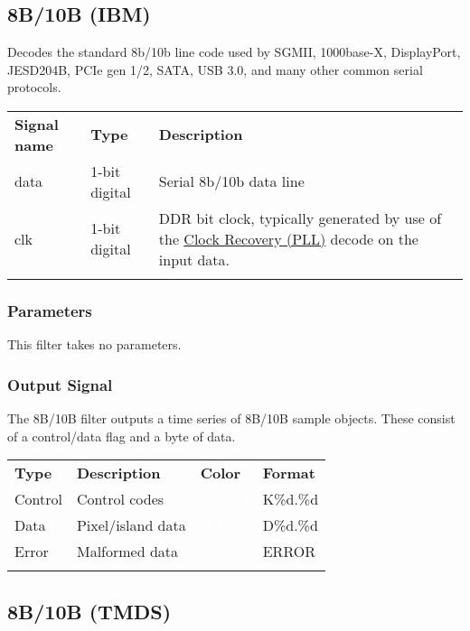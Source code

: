 \subsection{8B/10B (IBM)}

Decodes the standard 8b/10b line code used by SGMII, 1000base-X, DisplayPort, JESD204B, PCIe gen 1/2, SATA, USB 3.0,
and many other common serial protocols.

\begin{tabularx}{16cm}{llX}
\thickhline
\textbf{Signal name} & \textbf{Type} & \textbf{Description} \\
\thickhline
data & 1-bit digital & Serial 8b/10b data line \\
\thickhline
clk & 1-bit digital & DDR bit clock, typically generated by use of the \hyperref[filter:cdrpll]{Clock Recovery
(PLL)} decode on the input data.\\
\thickhline
\end{tabularx}

\subsubsection{Parameters}

This filter takes no parameters.

\subsubsection{Output Signal}

The 8B/10B filter outputs a time series of 8B/10B sample objects. These consist of a control/data flag and a byte of
data.

\begin{tabularx}{16cm}{lllX}
\thickhline
\textbf{Type} & \textbf{Description} & \textbf{Color} & \textbf{Format} \\
\thickhline
Control & Control codes & \cellcolor{control}\textcolor{white}{Control} & K\%d.\%d \\
\thickhline
Data & Pixel/island data & \cellcolor{data}\textcolor{white}{Data} & D\%d.\%d \\
\thickhline
Error & Malformed data & \cellcolor{error}\textcolor{white}{Error} & ERROR \\
\thickhline
\end{tabularx}

\pagebreak
\subsection{8B/10B (TMDS)}

